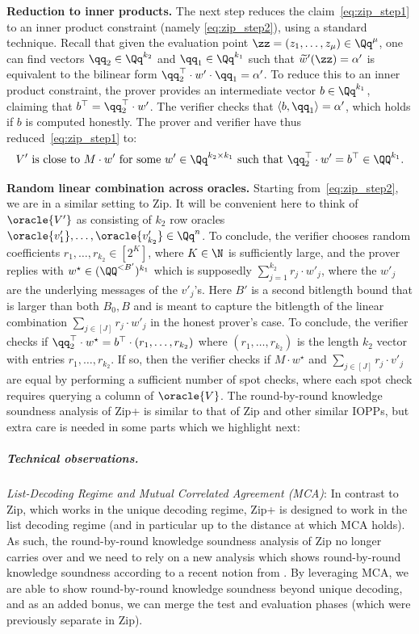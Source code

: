 \medskip
\noindent\textbf{Reduction to inner products.}
The next step reduces the claim~\eqref{eq:zip_step1} to an inner product constraint (namely \eqref{eq:zip_step2}), using a standard technique. Recall that given the evaluation point $\zz = (z_1, \ldots, z_\mu) \in \Qq^\mu$, one can find vectors $\qq_2 \in \Qq^{k_2}$ and $\qq_1 \in \Qq^{k_1}$ such that $\widetilde{w}'(\zz) = \alpha'$ is equivalent to the bilinear form $\qq_2^\top \cdot w' \cdot \qq_1 = \alpha'$. To reduce this to an inner product constraint, the prover provides an intermediate vector $b \in \Qq^{k_1}$, claiming that $b^\top = \qq_2^\top \cdot w'$. The verifier checks that $\langle b, \qq_1 \rangle = \alpha'$, which holds if $b$ is computed honestly. The prover and verifier have thus reduced~\eqref{eq:zip_step1} to:
\begin{equation}\label{eq:zip_step2}
  V' \text{ is close to } M \cdot w' \text{ for some } w' \in \Qq^{k_2 \times k_1} \text{ such that } \qq_2^\top \cdot w' = b^\top \in \QQ^{k_1}.
\end{equation}

\medskip
\noindent\textbf{Random linear combination across oracles.}
Starting from~\eqref{eq:zip_step2}, we are in a similar setting to Zip. It will be convenient here to think of $\oracle{V'}$ as consisting of $k_2$ row oracles $\oracle{v'_1}, \ldots, \oracle{v'_{k_2}} \in \Qq^{n}$. To conclude, the verifier chooses random coefficients $r_1, \ldots, r_{k_2} \in [2^K]$, where $K \in \N$ is sufficiently large, and the prover replies with $w^\star \in (\QQ^{< B'})^{k_1}$ which is supposedly $\sum_{j=1}^{k_2} r_j \cdot w'_j$, where the $w'_j$ are the underlying messages of the $v'_j$'s. Here $B'$ is a second bitlength bound that is larger than both $B_0, B$ and is meant to capture the bitlength of the linear combination $\sum_{j\in[J]} r_j \cdot w'_j$ in the honest prover's case. To conclude, the verifier checks if $\qq_2^\top \cdot w^\star = b^\top \cdot (r_1,\ldots, r_{k_2})$ where $(r_1,\ldots, r_{k_2})$ is the length $k_2$ vector with entries $r_1, \ldots, r_{k_2}$. If so, then the verifier checks if $M \cdot w^\star$ and $\sum_{j\in[J]} r_j \cdot v'_j$ are equal by performing a sufficient number of spot checks, where each spot check requires querying a column of $\oracle{V}$. The round-by-round knowledge soundness analysis of Zip+ is similar to that of Zip and other similar IOPPs, but extra care is needed in some parts which we highlight next:

\subparagraph{Technical observations.}  \emph{List-Decoding Regime and Mutual Correlated Agreement (MCA)}: In contrast to Zip, which works in the unique decoding regime, Zip+ is designed to work in the list decoding regime (and in particular up to the distance at which MCA holds). As such, the round-by-round knowledge soundness analysis of Zip no longer carries over and we need to rely on a new analysis which shows round-by-round knowledge soundness according to a recent notion from \cite{BCFW25}. By leveraging MCA, we are able to show round-by-round knowledge soundness beyond unique decoding, and as an added bonus, we can merge the test and evaluation phases (which were previously separate in Zip).
  
